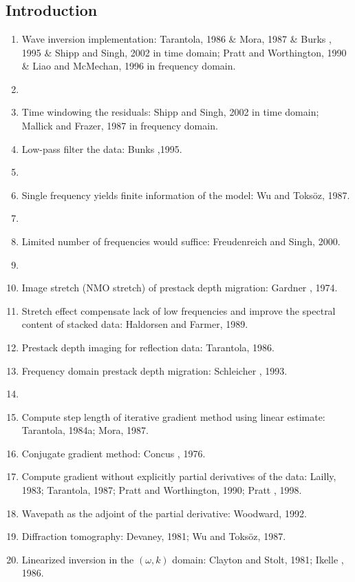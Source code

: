 \renewcommand{\pmk}{Sirgue\_2004\_Geophy\_Temporal frequencies selecting}
\renewcommand{\prf}{FWI/\pmk.pdf}
\renewcommand{\pti}{Efficient waveform inversion and imaging: A strategy for selecting temporal frequencies}
\renewcommand{\pay}{Laurent Sirgue and R. Gerhard Pratt, 2004}
\renewcommand{\pjo}{Geophysics}
\renewcommand{\pda}{2016/9/23 Fri.}
\section{\pinfo}
\subsection{Introduction}
\begin{enumerate}[\hspace{10mm}*]
  \item Wave inversion implementation: Tarantola, 1986 \& Mora, 1987 \& Burks \etal, 1995 \& Shipp and Singh, 2002 in time domain; Pratt and Worthington, 1990 \& Liao and McMechan, 1996 in frequency domain.
  \item \sline
  \item Time windowing the residuals: Shipp and Singh, 2002 in time domain; Mallick and Frazer, 1987 in frequency domain.
  \item Low-pass filter the data: Bunks \etal,1995.
  \item \sline
  \item Single frequency yields finite information of the model: Wu and Toks\"{o}z, 1987.
  \item \sline
  \item Limited number of frequencies would suffice: Freudenreich and Singh, 2000.
  \item \sline
  \item Image stretch (NMO stretch) of prestack depth migration: Gardner \etal, 1974.
  \item Stretch effect compensate lack of low frequencies and improve the spectral content of stacked data: Haldorsen and Farmer, 1989.
  \item Prestack depth imaging for reflection data: Tarantola, 1986.
  \item Frequency domain prestack depth migration: Schleicher \etal, 1993.
  \item \sline
  \item Compute step length of iterative gradient method using linear estimate: Tarantola, 1984a; Mora, 1987.
  \item Conjugate gradient method: Concus \etal, 1976.
  \item Compute gradient without explicitly partial derivatives of the data: Lailly, 1983; Tarantola, 1987; Pratt and Worthington, 1990; Pratt \etal, 1998.
  \item Wavepath as the adjoint of the \Frechet partial derivative: Woodward, 1992.
  \item Diffraction tomography: Devaney, 1981; Wu and Toks\"{o}z, 1987.
  \item Linearized inversion in the $(\omega,k)$ domain: Clayton and Stolt, 1981; Ikelle \etal, 1986.
\end{enumerate}\par

